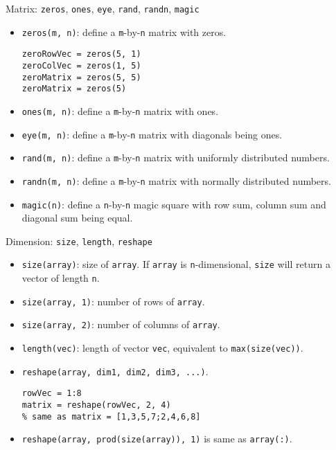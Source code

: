 \begin{frame}[fragile]{Matrix: \texttt{zeros}, \texttt{ones},
\texttt{eye}, \texttt{rand}, \texttt{randn}, \texttt{magic}}
\protect\hypertarget{matrix-zeros-ones-eye-rand-randn-magic}{}
\begin{itemize}[<+->]
\item
  \texttt{zeros(m,\ n)}: define a \texttt{m}-by-\texttt{n} matrix with
  zeros.

\begin{verbatim}
zeroRowVec = zeros(5, 1)
zeroColVec = zeros(1, 5)
zeroMatrix = zeros(5, 5)
zeroMatrix = zeros(5)
\end{verbatim}
\item
  \texttt{ones(m,\ n)}: define a \texttt{m}-by-\texttt{n} matrix with
  ones.
\item
  \texttt{eye(m,\ n)}: define a \texttt{m}-by-\texttt{n} matrix with
  diagonals being ones.
\item
  \texttt{rand(m,\ n)}: define a \texttt{m}-by-\texttt{n} matrix with
  uniformly distributed numbers.
\item
  \texttt{randn(m,\ n)}: define a \texttt{m}-by-\texttt{n} matrix with
  normally distributed numbers.
\item
  \texttt{magic(n)}: define a \texttt{n}-by-\texttt{n} magic square with
  row sum, column sum and diagonal sum being equal.
\end{itemize}
\end{frame}

\begin{frame}[fragile]{Dimension: \texttt{size}, \texttt{length},
\texttt{reshape}}
\protect\hypertarget{dimension-size-length-reshape}{}
\begin{itemize}[<+->]
\item
  \texttt{size(array)}: size of \texttt{array}. If \texttt{array} is
  \texttt{n}-dimensional, \texttt{size} will return a vector of length
  \texttt{n}.
\item
  \texttt{size(array,\ 1)}: number of rows of \texttt{array}.
\item
  \texttt{size(array,\ 2)}: number of columns of \texttt{array}.
\item
  \texttt{length(vec)}: length of vector \texttt{vec}, equivalent to
  \texttt{max(size(vec))}.
\item
  \texttt{reshape(array,\ dim1,\ dim2,\ dim3,\ ...)}.

\begin{verbatim}
rowVec = 1:8
matrix = reshape(rowVec, 2, 4)
% same as matrix = [1,3,5,7;2,4,6,8]
\end{verbatim}
\item
  \texttt{reshape(array,\ prod(size(array)),\ 1)} is same as
  \texttt{array(:)}.
\end{itemize}
\end{frame}

